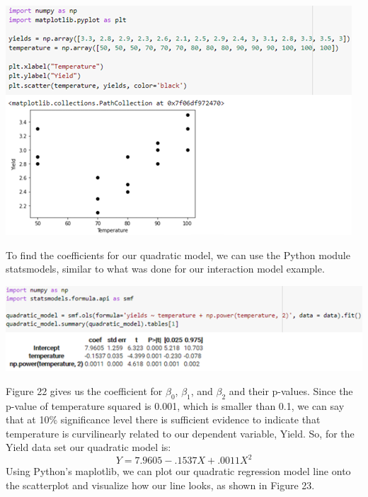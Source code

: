 \documentclass[a4paper,12pt]{report}
\begin{document}
\begin{center}
    \captionsetup{type=figure}
    \includegraphics[width=.9\linewidth]{media/scatterTemperature.png}
\end{center}

To find the coefficients for our quadratic model, we can use the Python module statsmodels, similar to what was done for our interaction model example. 

\begin{center}
    \captionsetup{type=figure}
    \includegraphics[width=.9\linewidth]{media/smfols.png}
\end{center}

Figure 22 gives us the coefficient for $\beta_0$, $\beta_1$, and $\beta_2$ and their p-values. Since the p-value of temperature squared is 0.001, which is smaller than 0.1, we can say that at 10\% significance level there is sufficient evidence to indicate that temperature is curvilinearly related to our dependent variable, Yield. So, for the Yield data set our quadratic model is:
$$Y=7.9605-.1537X+.0011X^2$$
Using Python’s maplotlib, we can plot our quadratic regression model line onto the scatterplot and visualize how our line looks, as shown in Figure 23. 
\end{document}
